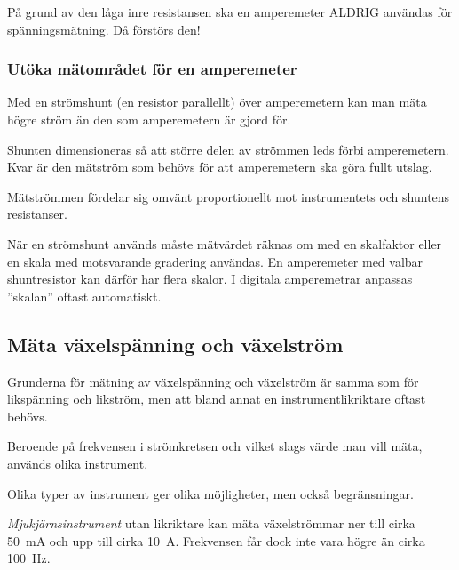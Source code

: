 \begin{center}
\begin{minipage}{0.19\columnwidth}
\Huge{\selectfont{}\relax}
\end{minipage}
\begin{minipage}{0.7\columnwidth}
På grund av den låga inre resistansen ska en amperemeter
ALDRIG användas för spänningsmätning. Då förstörs den!
\end{minipage}
\end{center}


\subsubsection{Utöka mätområdet för en amperemeter}

Med en strömshunt (en resistor parallellt) över amperemetern kan man
mäta högre ström än den som amperemetern är gjord för.

Shunten dimensioneras så att större delen av strömmen leds förbi amperemetern.
Kvar är den mätström som behövs för att amperemetern ska göra fullt utslag.

Mätströmmen fördelar sig omvänt proportionellt mot instrumentets och
shuntens resistanser.

När en strömshunt används måste mätvärdet räknas om med en skalfaktor
eller en skala med motsvarande gradering användas.
En amperemeter med valbar shuntresistor kan därför har flera skalor.
I digitala amperemetrar anpassas ''skalan'' oftast automatiskt.

\subsection{Mäta växelspänning och växelström}

Grunderna för mätning av växelspänning och växelström är samma som för
likspänning och likström, men att bland annat en instrumentlikriktare oftast
behövs.

Beroende på frekvensen i strömkretsen och vilket slags värde man vill
mäta, används olika instrument.

Olika typer av instrument ger olika möjligheter, men också begränsningar.

\emph{Mjukjärnsinstrument} utan likriktare kan mäta växelströmmar ner
till cirka \SI{50}{\milli\ampere} och upp till cirka \SI{10}{\ampere}.
Frekvensen får dock inte vara högre än cirka \SI{100}{\hertz}.

